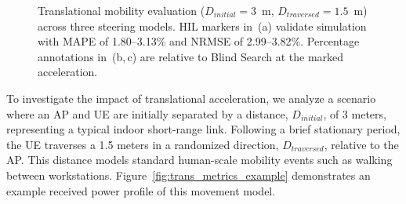 \documentclass[fleqn,10pt]{wlscirep}
\newcommand{\legmark}[2]{%
    \tikz[Blind Search=-0.5ex]{
        \node[#2, fill=#1, draw=#1, inner sep=2pt, scale=0.8] at (0,0) {};
    }%
}
\begin{document}
\begin{figure}[ht!]
    
    \caption{Translational mobility evaluation ($D_{initial} = 3$~m, $D_{traversed} = 1.5$~m) across three steering models. HIL markers in~(a) validate simulation with MAPE of 1.80--3.13\% and NRMSE of 2.99--3.82\%. Percentage annotations in~(b,\,c) are relative to Blind Search at the marked acceleration.}
    \label{fig:translational_rate}
\end{figure}


To investigate the impact of translational acceleration, we analyze a scenario where an AP and UE are initially separated by a distance, $D_{initial}$, of 3 meters, representing a typical indoor short-range link\cite{9013236}. Following a brief stationary period, the UE traverses a 1.5 meters in a randomized direction, $D_{traversed}$, relative to the AP. This distance models standard human-scale mobility events such as walking between workstations. Figure~\ref{fig:trans_metrics_example} demonstrates an example received power profile of this movement model. 

\end{document}
